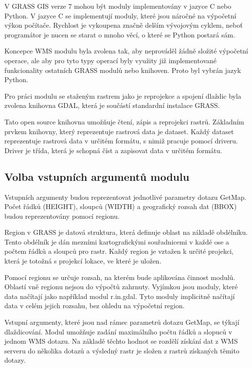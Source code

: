 \documentclass[a4paper,12pt]{article}
\begin{document}
V GRASS GIS verze 7 mohou být moduly implementovány v jazyce C nebo
Python. V jazyce C se implementují moduly, které jsou náročné na
výpočetní výkon počítače.  Rychlost je vykoupena značně delším
vývojovým cyklem, neboť programátor je nucen se starat o mnoho věcí, o
které se Python postará sám.

Koncepce WMS modulu byla zvolena tak, aby neprováděl žádně složité
výpočetní operace, ale aby pro tyto typy operací byly využity již
implementované funkcionality ostatních GRASS modulů nebo
knihoven. Proto byl vybrán jazyk Python.

Pro práci modulu se staženým rastrem jako je reprojekce a spojení
dlaždic byla zvolena knihovna GDAL, která je součástí standardní
instalace GRASS.

Tato open source knihovna umožňuje čtení, zápis a reprojekci rastrů.
Základním prvkem knihovny, který reprezentuje rastrová data je
dataset. Každý dataset reprezentuje rastrová data v určitém formátu,
s nimiž pracuje pomocí driveru. Driver je třída, která je schopná číst
a zapisovat data v určitém formátu.

\subsection{Volba vstupních argumentů modulu}


Vstupních argumenty budou reprezentovat jednotlivé parametry dotazu
GetMap. Počet řádků (HEIGHT), sloupců (WIDTH) a geografický rozsah dat
(BBOX) budou reprezentovány pomocí regionu.

Region v GRASS je datová struktura, která definuje oblast na základě
obdélníku. Tento obdélník je dán mezními kartografickými souřadnicemi
v každé ose a počtem řádků a sloupců pro rastr. Každý region je
vztažen k určité projekci, která je totožná s projekcí lokace, ve
které je uložen.

Pomocí regionu se určuje rozsah, na kterém bude aplikována činnost
modulů.  Oblastí vně regionu nejsou do výpočtů zahrnuty. Vyjímkou jsou
moduly, které data načítají jako například modul r.in.gdal. Tyto
moduly implicitně načítají data v celém jejich rozsahu, bez ohledu na
výpočetní region.

Vstupní argumenty, které jsou nad rámec parametrů dotazu GetMap, se
týkají dlaždicování. Modul umožňuje zadání maximálního počtu řádků a
slopuců v jednom WMS dotazu. Na základě těchto hodnot se rozdělí
získání dat z WMS serveru do několika dotazů a výsledný rastr je
složen z rastrů získaných těmito dotazy.
   
\end{document}
